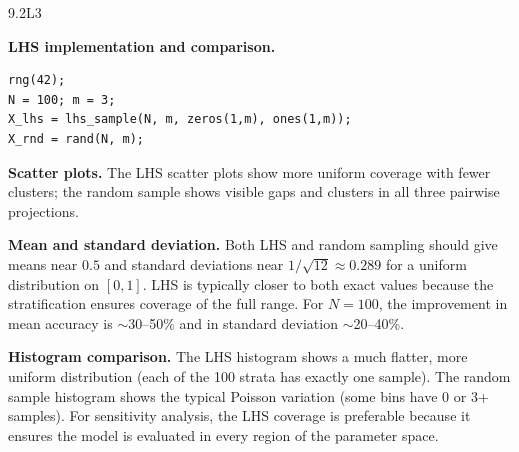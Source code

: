 \begin{solution}{9.2}{L3}

\solanswer

 \textbf{LHS implementation and comparison.}

\begin{verbatim}
rng(42);
N = 100; m = 3;
X_lhs = lhs_sample(N, m, zeros(1,m), ones(1,m));
X_rnd = rand(N, m);
\end{verbatim}

 \textbf{Scatter plots.} The LHS scatter plots show more
uniform coverage with fewer clusters; the random sample shows visible gaps
and clusters in all three pairwise projections.

 \textbf{Mean and standard deviation.}
Both LHS and random sampling should give means near $0.5$ and
standard deviations near $1/\sqrt{12} \approx 0.289$ for a uniform
distribution on $[0,1]$. LHS is typically closer to both exact values
because the stratification ensures coverage of the full range. For $N = 100$,
the improvement in mean accuracy is $\sim$30--50\% and in standard deviation
$\sim$20--40\%.

 \textbf{Histogram comparison.}
The LHS histogram shows a much flatter, more uniform distribution
(each of the 100 strata has exactly one sample). The random sample
histogram shows the typical Poisson variation (some bins have 0 or 3+ samples).
For sensitivity analysis, the LHS coverage is preferable because
it ensures the model is evaluated in every region of the parameter space.


\end{solution}

